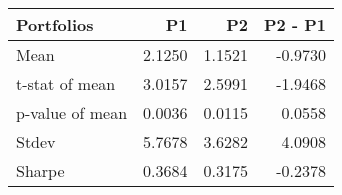 \begin{tabular}{lrrr}
\toprule
Portfolios & P1 & P2 & P2 - P1 \\
\midrule
Mean & 2.1250 & 1.1521 & -0.9730 \\
t-stat of mean & 3.0157 & 2.5991 & -1.9468 \\
p-value of mean & 0.0036 & 0.0115 & 0.0558 \\
Stdev & 5.7678 & 3.6282 & 4.0908 \\
Sharpe & 0.3684 & 0.3175 & -0.2378 \\
\bottomrule
\end{tabular}
